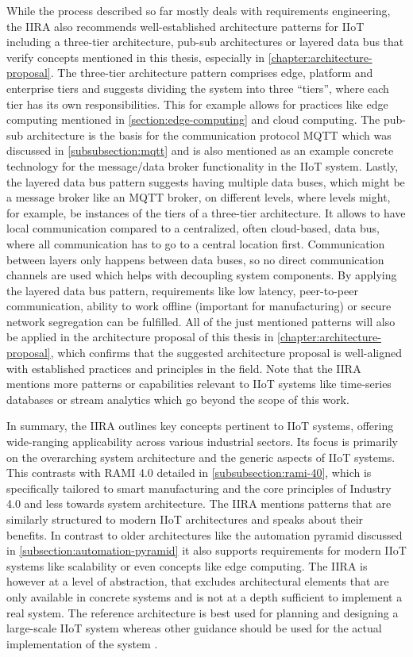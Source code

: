         While the process described so far mostly deals with requirements engineering, the IIRA also recommends well-established architecture patterns for IIoT including a three-tier architecture, pub-sub architectures or layered data bus that verify concepts mentioned in this thesis, especially in \autoref{chapter:architecture-proposal}. 
        The three-tier architecture pattern comprises edge, platform and enterprise tiers and suggests dividing the system into three ``tiers'', where each tier has its own responsibilities. This for example allows for practices like edge computing mentioned in \autoref{section:edge-computing} and cloud computing. The pub-sub architecture is the basis for the communication protocol MQTT which was discussed in \autoref{subsubsection:mqtt} and is also mentioned as an example concrete technology for the message/data broker functionality in the IIoT system. Lastly, the layered data bus pattern suggests having multiple data buses, which might be a message broker like an MQTT broker, on different levels, where levels might, for example, be instances of the tiers of a three-tier architecture. It allows to have local communication compared to a centralized, often cloud-based, data bus, where all communication has to go to a central location first. Communication between layers only happens between data buses, so no direct communication channels are used which helps with decoupling system components. By applying the layered data bus pattern, requirements like low latency, peer-to-peer communication, ability to work offline (important for manufacturing) or secure network segregation can be fulfilled. All of the just mentioned patterns will also be applied in the architecture proposal of this thesis in \autoref{chapter:architecture-proposal}, which confirms that the suggested architecture proposal is well-aligned with established practices and principles in the field. Note that the IIRA mentions more patterns or capabilities relevant to IIoT systems like time-series databases or stream analytics which go beyond the scope of this work.
        
        In summary, the IIRA outlines key concepts pertinent to IIoT systems, offering wide-ranging applicability across various industrial sectors. Its focus is primarily on the overarching system architecture and the generic aspects of IIoT systems. This contrasts with RAMI 4.0 detailed in \autoref{subsubsection:rami-40}, which is specifically tailored to smart manufacturing and the core principles of Industry 4.0 and less towards system architecture. The IIRA mentions patterns that are similarly structured to modern IIoT architectures and speaks about their benefits. In contrast to older architectures like the automation pyramid discussed in \autoref{subsection:automation-pyramid} it also supports requirements for modern IIoT systems like scalability or even concepts like edge computing. The IIRA is however at a level of abstraction, that excludes architectural elements that are only available in concrete systems and is not at a depth sufficient to implement a real system. The reference architecture is best used for planning and designing a large-scale IIoT system whereas other guidance should be used for the actual implementation of the system \cite{iiot_consort_iira}.
        